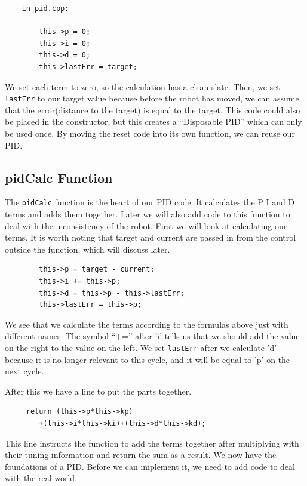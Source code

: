 \documentclass[12pt]{report}
\begin{document}
    \begin{verbatim}
    in pid.cpp:

        this->p = 0;
        this->i = 0;
        this->d = 0;
        this->lastErr = target;
    \end{verbatim}

    We set each term to zero, so the calculation has a clean slate.
    Then, we set \verb|lastErr| to our target value because before the robot has moved, we can assume that the error(distance to the target) is equal to the target.
    This code could also be placed in the constructor, but this creates a ``Disposable PID'' which can only be used once.
    By moving the reset code into its own function, we can reuse our PID.

\subsection{pidCalc Function}

    The \verb|pidCalc| function is the heart of our PID code. It calculates the P I and D terms and adds them together. Later we will also add code to this function to deal with the inconsistency of the robot. First we will look at calculating our terms. It is worth noting that target and current are passed in from the control outside the function, which will discuss later.
    \begin{verbatim}
        this->p = target - current;
        this->i += this->p;
        this->d = this->p - this->lastErr;
        this->lastErr = this->p;
    \end{verbatim}

    We see that we calculate the terms according to the formulas above just with different names.
    The symbol ``+='' after 'i' tells us that we should add the value on the right to the value on the left.
    We set \verb|lastErr| after we calculate 'd' because it is no longer relevant to this cycle, and it will be equal to 'p' on the next cycle.

    After this we have a line to put the parts together.
    \begin{verbatim}
     return (this->p*this->kp)
        +(this->i*this->ki)+(this->d*this->kd);
    \end{verbatim}

    This line instructs the function to add the terms together after multiplying with their tuning information and return the sum as a result.
    We now have the foundations of a PID.
    Before we can implement it, we need to add code to deal with the real world.
\end{document}

